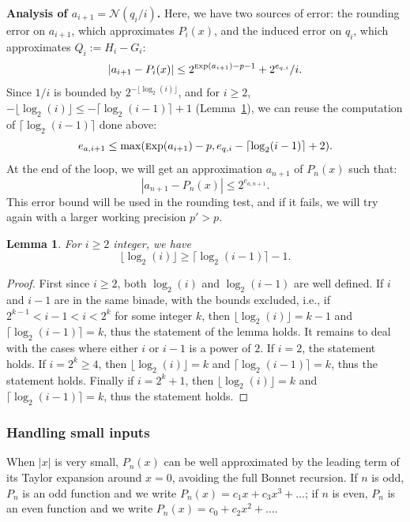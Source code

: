 \documentclass[12pt]{amsart}
\def\Exp{{\rm \textsc exp}}
\def\N{{\mathcal N}}
\newtheorem{lemma}{Lemma}
\begin{document}
\par\noindent
\textbf{Analysis of $a_{i+1} = \N{}(q_i/i)$.}
Here, we have two sources of error: the rounding error on $a_{i+1}$,
which approximates $P_i(x)$, and the induced error on $q_i$, which
approximates $Q_i := H_i - G_i$:
\[ |a_{i+1} - P_i(x)| \le 2^{\Exp(a_{i+1})-p-1} + 2^{e_{q,i}}/i. \]
Since $1/i$ is bounded by $2^{-\lfloor \log_2(i) \rfloor}$, and for
$i \ge 2$, $-\lfloor \log_2(i) \rfloor \le -\lceil \log_2(i-1) \rceil +1$
(Lemma~\ref{lemma8}),
we can reuse the computation of $\lceil \log_2(i-1) \rceil$ done above:
\[ e_{a,i+1} \le \max(\Exp(a_{i+1})-p, e_{q,i} - \lceil \log_2(i-1) \rceil + 2). \]
At the end of the loop, we will get an approximation $a_{n+1}$ of $P_n(x)$ such
that:
\[ |a_{n+1} - P_n(x)| \le 2^{e_{a,n+1}}. \]
This error bound will be used in the rounding test, and if it fails, we will try
again with a larger working precision $p' > p$.

\begin{lemma} \label{lemma8}
  For $i \ge 2$ integer, we have
  \[ \lfloor \log_2(i) \rfloor \ge \lceil \log_2(i-1) \rceil - 1. \]
\end{lemma}
\begin{proof}
  First since $i \ge 2$, both $\log_2(i)$ and $\log_2(i-1)$ are well defined.
  If $i$ and $i-1$ are in the same binade, with the bounds excluded, i.e.,
  if $2^{k-1} < i-1 < i < 2^k$ for some integer $k$, then
  $\lfloor \log_2(i) \rfloor = k-1$ and $\lceil \log_2(i-1) \rceil = k$,
  thus the statement of the lemma holds.
  It remains to deal with the cases where either $i$ or $i-1$ is a power of $2$.
  If $i=2$, the statement holds.
  If $i=2^k \ge 4$, then $\lfloor \log_2(i) \rfloor = k$ and
  $\lceil \log_2(i-1) \rceil = k$, thus the statement holds.
  Finally if $i=2^k+1$, then $\lfloor \log_2(i) \rfloor = k$ and
  $\lceil \log_2(i-1) \rceil = k$, thus	the statement holds.
\end{proof}

\subsubsection{Handling small inputs}

When $|x|$ is very small, $P_n(x)$ can be well approximated by the leading
term of its Taylor expansion around $x=0$, avoiding the full Bonnet recursion.
If $n$ is odd, $P_n$ is an odd function and we write
$P_n(x) = c_1 x + c_3 x^3 + \dots$;
if $n$ is even, $P_n$ is an even function and we write
$P_n(x) = c_0 + c_2 x^2 + \dots$.
\end{document}
